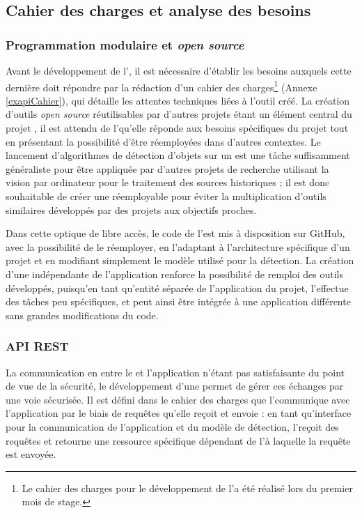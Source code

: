 \subsection{Cahier des charges et analyse des besoins}
    \subsubsection{Programmation modulaire et \textit{open source}}
    Avant le développement de l'\api, il est nécessaire d'établir les besoins auxquels cette dernière doit répondre par la rédaction d'un cahier des charges\footnote{Le cahier des charges pour le développement de l'\api a été réalisé lors du premier mois de stage.} (Annexe \ref{exapiCahier}), qui détaille les attentes techniques liées à l'outil créé. La création d'outils \textit{open source} réutilisables par d'autres projets étant un élément central du projet \eida, il est attendu de l'\api qu'elle réponde aux besoins spécifiques du projet tout en présentant la possibilité d'être réemployées dans d'autres contextes. Le lancement d'algorithmes de détection d'objets sur un \gpu est une tâche suffisamment généraliste pour être appliquée par d'autres projets de recherche utilisant la vision par ordinateur pour le traitement des sources historiques ; il est donc souhaitable de créer une \api réemployable pour éviter la multiplication d'outils similaires développés par des projets aux objectifs proches.
    
    Dans cette optique de libre accès, le code de l'\api est mis à disposition sur GitHub, avec la possibilité de le réemployer, en l'adaptant à l'architecture spécifique d'un projet et en modifiant simplement le modèle utilisé pour la détection. La création d'une \api indépendante de l'application \eida renforce la possibilité de remploi des outils développés, puisqu'en tant qu'entité séparée de l'application du projet, l'\api effectue des tâches peu spécifiques, et peut ainsi être intégrée à une application différente sans grandes modifications du code. 
    
    \subsubsection{API REST}
    La communication en \ssh entre le \gpu et l’application \eida n’étant pas satisfaisante du point de vue de la sécurité, le développement d’une \api permet de gérer ces échanges par une voie sécurisée. Il est défini dans le cahier des charges que l'\api communique avec l'application par le biais de requêtes \http qu'elle reçoit et envoie : en tant qu'interface pour la communication de l'application et du modèle de détection, l'\api reçoit des requêtes \http et retourne une ressource spécifique dépendant de l'\URL à laquelle la requête est envoyée.
    
